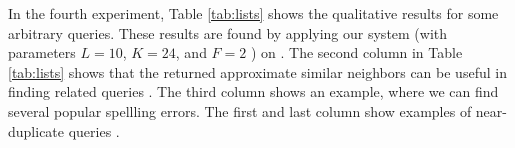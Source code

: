 In the fourth experiment, Table \ref{tab:lists} shows the qualitative results for some arbitrary queries. These results are found by applying our
system (\dflipb with parameters $L=10$, $K=24$, and $F=2$ ) on \dataC. The second column in Table \ref{tab:lists} shows that the returned approximate 
similar neighbors can be useful in finding related queries \cite{Jones06WWW,Jain11SIGIR}. 
The third column shows an example, where we can find several popular spellling errors. 
The first and last column show examples of near-duplicate queries \cite{leeCIKM11}.  






